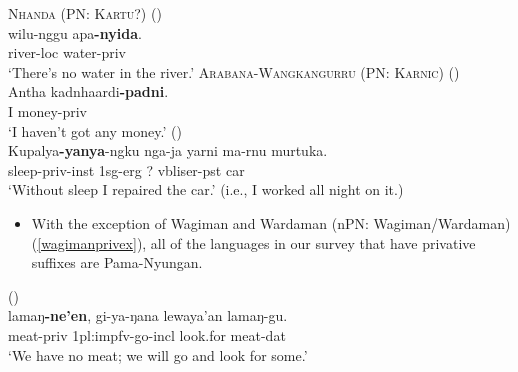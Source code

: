 \documentclass{article}
\begin{document}


\begin{exe}
  \ex \textsc{Nhanda (PN: Kartu?)} (\citealt[64]{blevins01}) \label{privexist1}\\
  \gll wilu-nggu apa\textbf{-nyida}.\\
  river-{\sc loc} water-{\sc priv}\\
  \glt `There's no water in the river.'
  \ex \textsc{Arabana-Wangkangurru (PN: Karnic)} (\citealt[237]{hercus94})\\
  \gll Antha kadnhaardi\textbf{-padni}.\\
  I money-{\sc priv}\\
  \glt `I haven't got any money.'
  (\citealt[33]{westerlund07})\\
 \gll Kupalya\textbf{-yanya}-ngku nga-ja     yarni ma-rnu murtuka.\\
sleep-{\sc priv-inst}     1{\sc sg-erg}  ?     {\sc vbliser-pst} car \\
    \glt `Without sleep I repaired the car.' (i.e., I worked all night on it.)
\end{exe}

\begin{itemize}
    \item With the exception of Wagiman and Wardaman (nPN: Wagiman/Wardaman) (\ref{wagimanprivex}), all of the languages in our survey that have privative suffixes are Pama-Nyungan.
\end{itemize}

\begin{exe}
 (\citealt[133-134]{cook87}) \label{wagimanprivex}\\
\gll lamaŋ\textbf{-ne'en}, gi-ya-ŋana lewaya'an lamaŋ-gu.\\
meat-{\sc priv} 1{\sc pl:impfv}-go-{\sc incl} look.for meat-{\sc dat}\\
\glt `We have no meat; we will go and look for some.'
\end{exe}
\end{document}

